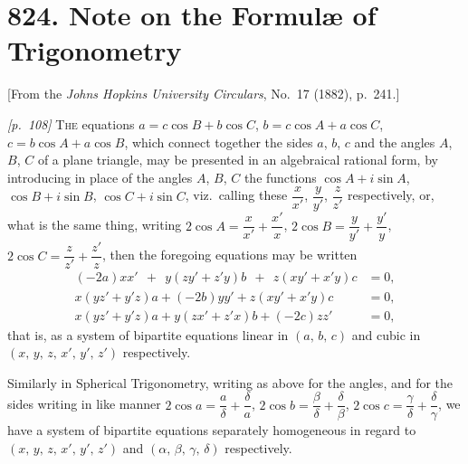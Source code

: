 \documentclass[11pt,a4paper]{article}
\theoremstyle{plain}
\theoremstyle{definition}
\theoremstyle{remark}
\begin{document}
\bigskip

\newpage
\section*{824. Note on the Formul\ae{} of Trigonometry}

\begin{center}
\small[From the \textit{Johns Hopkins University Circulars}, No.~17 (1882), p.~241.]
\end{center}

\bigskip

\noindent\textit{[p.~108]} \textsc{The} equations $a = c\cos B + b\cos C$, $b = c\cos A + a\cos C$, $c = b\cos A + a\cos B$, which connect together the sides $a$, $b$, $c$ and the angles $A$, $B$, $C$ of a plane triangle, may be presented in an algebraical rational form, by introducing in place of the angles $A$, $B$, $C$ the functions $\cos A + i\sin A$, $\cos B + i\sin B$, $\cos C + i\sin C$, viz.\ calling these $\dfrac{x}{x'}$, $\dfrac{y}{y'}$, $\dfrac{z}{z'}$ respectively, or, what is the same thing, writing $2\cos A = \dfrac{x}{x'} + \dfrac{x'}{x}$, $2\cos B = \dfrac{y}{y'} + \dfrac{y'}{y}$, $2\cos C = \dfrac{z}{z'} + \dfrac{z'}{z}$, then the foregoing equations may be written
\begin{align*}
(-2a)xx' \;\,+\,\; y(z y' + z' y)b \;\,+\,\; z(x y' + x' y)c &= 0,\\
x(yz' + y'z)a + (-2b)yy' + z(x y' + x' y)c &= 0,\\
x(yz' + y'z)a + y(z x' + z' x)b + (-2c)zz' &= 0,
\end{align*}
that is, as a system of bipartite equations linear in $(a,\,b,\,c)$ and cubic in $(x,\,y,\,z,\,x',\,y',\,z')$ respectively.

Similarly in Spherical Trigonometry, writing as above for the angles, and for the sides writing in like manner $2\cos a = \dfrac{a}{\delta} + \dfrac{\delta}{a}$, $2\cos b = \dfrac{\beta}{\delta} + \dfrac{\delta}{\beta}$, $2\cos c = \dfrac{\gamma}{\delta} + \dfrac{\delta}{\gamma}$, we have a system of bipartite equations separately homogeneous in regard to $(x,\,y,\,z,\,x',\,y',\,z')$ and $(\alpha,\,\beta,\,\gamma,\,\delta)$ respectively.

\bigskip

\newpage
\end{document}
